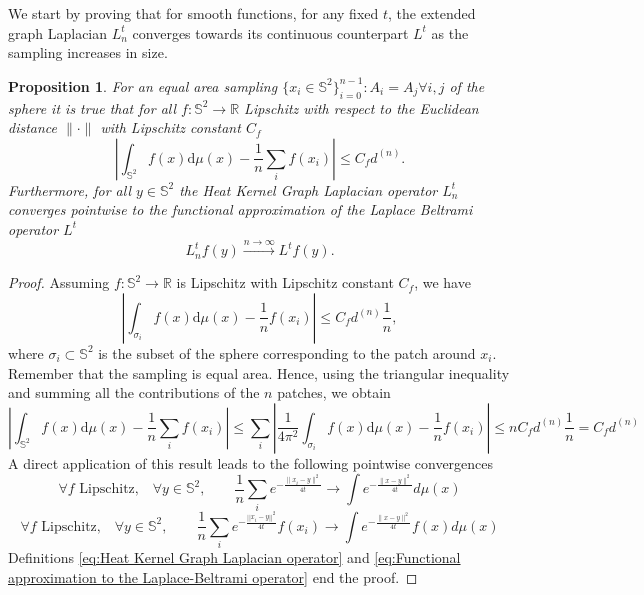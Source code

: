 \documentclass{article} %
\newtheorem{prop}{Proposition}
\newcommand{\R}{\mathbb{R}}
\renewcommand{\S}{\mathbb{S}}
\begin{document}
We start by proving that for smooth functions, for any fixed $t$, the extended graph Laplacian $L^t_n$ converges towards its continuous counterpart $L^t$ as the sampling increases in size.
\begin{prop}\label{prop:1}
	For an equal area sampling $\{x_i\in\S^2\}_{i=0}^{n-1}: A_i=A_j \forall i,j$ of the sphere it is true that for all $f: \S^2 \rightarrow \R$ Lipschitz with respect to the Euclidean distance $\|\cdot\|$ with Lipschitz constant $C_f$
	\begin{equation*}
	\left| \int_{\S^2}f({ x})\text{d}{\mu(x)} - \frac{1}{n}\sum_i f( x_i)\right|\leq C_f d^{(n)}.	    
	\end{equation*}
	Furthermore, for all $y\in\S^2$ the Heat Kernel Graph Laplacian operator $L^t_n$ converges pointwise to the functional approximation of the Laplace Beltrami operator $L^t$
	\begin{equation*}
	 L_n^tf(y)\xrightarrow{n\to\infty} L^tf(y).
	\end{equation*}
\end{prop}
\begin{proof}

	Assuming $f:\mathbb S^2 \rightarrow \R$ is Lipschitz with Lipschitz constant $C_f$, we have
	\begin{equation*}
	\left| \int_{\sigma_{i}}f({ x})\text{d}{\mu(x)} - \frac{1}{n}f( x_i)\right| \leq C_fd^{(n)}\frac{1}{n},	    
	\end{equation*}
	where $\sigma_i\subset \S^2$ is the subset of the sphere corresponding to the patch around $x_i$. Remember that the sampling is equal area.
	Hence, using the triangular inequality and summing all the contributions of the $n$ patches, we obtain
	\begin{equation*}
	\left| \int_{\S^2}f({ x})\text{d}{\mu(x)} - \frac{1}{n}\sum_i f( x_i)\right| \leq \sum_i \left| \frac{1}{4\pi^2} \int_{\sigma_{i}}f({ x})\text{d}{\mu(x)} - \frac{1}{n}f( x_i)\right|\leq n  C_fd^{(n)}\frac{1}{n} = C_fd^{(n)}
	\end{equation*}
	A direct application of this result leads to the following pointwise convergences
	\begin{equation*}
	\forall f \text{ Lipschitz,}\quad \forall y\in\S^2,  \quad\quad \frac{1}{n}\sum_i e^{-\frac{\|x_i-y\|^2}{4t}}\rightarrow   \int e^{-\frac{\|x-y\|^2}{4t}}d\mu(x) 
	\end{equation*}
    \begin{equation*}
    \forall f \text{ Lipschitz,}\quad \forall y\in\S^2,  \quad\quad \frac{1}{n}\sum_i e^{-\frac{||x_i-y||^2}{4t}}f(x_i)\rightarrow   \int e^{-\frac{\|x-y\|^2}{4t}}f(x)d\mu(x)        
    \end{equation*}
	Definitions \ref{eq:Heat Kernel Graph Laplacian operator} and \ref{eq:Functional approximation to the Laplace-Beltrami operator} end the proof.
\end{proof}
\end{document}
